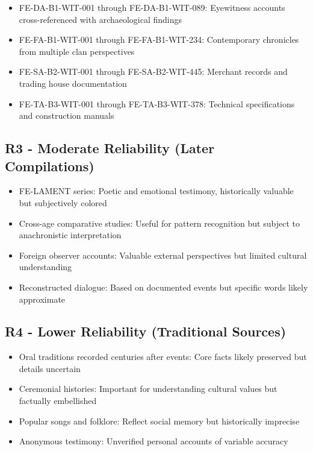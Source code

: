 \begin{itemize}
\tightlist
\item
  FE-DA-B1-WIT-001 through FE-DA-B1-WIT-089: Eyewitness accounts
  cross-referenced with archaeological findings
\item
  FE-FA-B1-WIT-001 through FE-FA-B1-WIT-234: Contemporary chronicles
  from multiple clan perspectives
\item
  FE-SA-B2-WIT-001 through FE-SA-B2-WIT-445: Merchant records and
  trading house documentation
\item
  FE-TA-B3-WIT-001 through FE-TA-B3-WIT-378: Technical specifications
  and construction manuals
\end{itemize}

\subsection{R3 - Moderate Reliability (Later
Compilations)}\label{r3---moderate-reliability-later-compilations}

\begin{itemize}
\tightlist
\item
  FE-LAMENT series: Poetic and emotional testimony, historically
  valuable but subjectively colored
\item
  Cross-age comparative studies: Useful for pattern recognition but
  subject to anachronistic interpretation
\item
  Foreign observer accounts: Valuable external perspectives but limited
  cultural understanding
\item
  Reconstructed dialogue: Based on documented events but specific words
  likely approximate
\end{itemize}

\subsection{R4 - Lower Reliability (Traditional
Sources)}\label{r4---lower-reliability-traditional-sources}

\begin{itemize}
\tightlist
\item
  Oral traditions recorded centuries after events: Core facts likely
  preserved but details uncertain
\item
  Ceremonial histories: Important for understanding cultural values but
  factually embellished
\item
  Popular songs and folklore: Reflect social memory but historically
  imprecise
\item
  Anonymous testimony: Unverified personal accounts of variable accuracy
\end{itemize}

